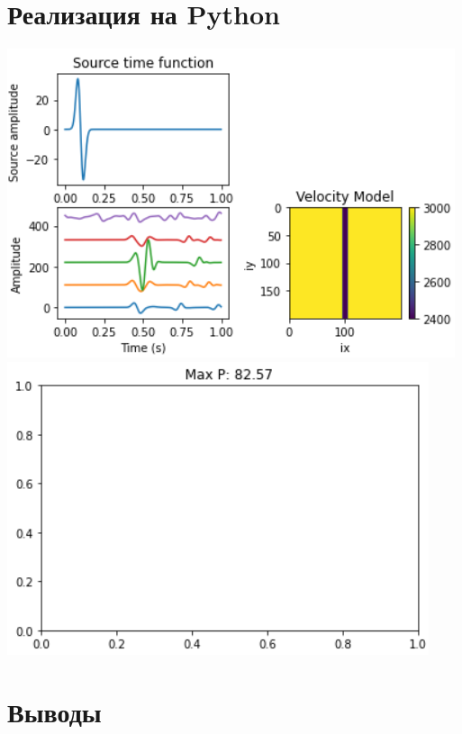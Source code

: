 \documentclass{article}
\begin{document}
\section{Реализация на Python}
\includegraphics[width=1\linewidth]{111}
\includegraphics[width=1\linewidth]{112}
\section{Выводы}
\end{document}
